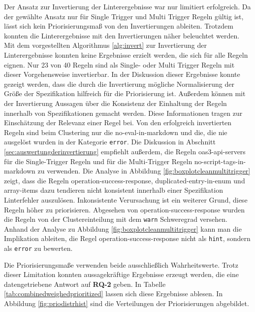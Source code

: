 Der Ansatz zur Invertierung der Linterergebnisse war nur limitiert erfolgreich. Da der gewählte Ansatz nur für Single Trigger und Multi Trigger Regeln gültig ist, lässt sich kein Priorisierungsmaß von den Invertierungen ableiten. Trotzdem konnten die Linterergebnisse mit den Invertierungen näher beleuchtet werden. Mit dem vorgestellten Algorithmus \ref{alg:invert} zur Invertierung der Linterergebnisse konnten keine Ergebnisse erzielt werden, die sich für alle Regeln eignen. Nur 23 von 40 Regeln sind als Single- oder Multi Trigger Regeln mit dieser Vorgehensweise invertierbar. In der Diskussion dieser Ergebnisse konnte gezeigt werden, dass die durch die Invertierung mögliche Normalisierung der Größe der Spezifikation hilfreich für die Priorisierung ist. Außerdem können mit der Invertierung Aussagen über die Konsistenz der Einhaltung der Regeln innerhalb von Spezifikationen gemacht werden. Diese Informationen tragen zur Einschätzung der Relevanz einer Regel bei. Von den erfolgreich invertierten Regeln sind beim Clustering nur die no-eval-in-markdown und die, die nie ausgelöst wurden in der Kategorie \texttt{error}. Die Diskussion in Abschnitt \ref{sec:auswertungderinvertierung} empfiehlt außerdem, die Regeln oas3-api-servers für die Single-Trigger Regeln und für die Multi-Trigger Regeln no-script-tags-in-markdown zu verwenden. Die Analyse in Abbildung \ref{fig:boxplotcleanmultitrigger} zeigt, dass die Regeln operation-success-response, duplicated-entry-in-enum und array-items dazu tendieren nicht konsistent innerhalb einer Spezifikation Linterfehler auszulösen. Inkonsistente Verursachung ist ein weiterer Grund, diese Regeln höher zu priorisieren. Abgesehen von operation-success-response wurden die Regeln von der Clustereinteilung mit dem \texttt{warn} Schweregrad versehen. Anhand der Analyse zu Abbildung \ref{fig:boxplotcleanmultitrigger} kann man die Implikation ableiten, die Regel operation-success-response nicht als \texttt{hint}, sondern als \texttt{error} zu bewerten.

Die Priorisierungsmaße verwenden beide ausschließlich Wahrheitswerte. Trotz dieser Limitation konnten aussagekräftige Ergebnisse erzeugt werden, die eine datengetriebene Antwort auf \textbf{RQ-2} geben. In Tabelle \ref{tab:combinedweighedprioritized} lassen sich diese Ergebnisse ablesen. In Abbildung \ref{fig:priodistrhist} sind die Verteilungen der Priorisierungen abgebildet. 

